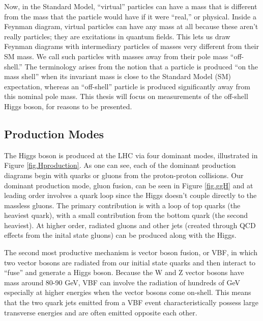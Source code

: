 Now, in the Standard Model, ``virtual'' particles can have a mass that is different from the mass that the
particle would have if it were ``real,'' or physical. Inside a Feynman diagram, virtual particles can have any
mass at all because these aren’t really particles; they are excitations in quantum fields.
This lets us draw Feynman diagrams with intermediary particles of masses very different from their SM mass. 
We call such particles with masses away from their pole mass ``off-shell.''  The terminology arises from the notion that a particle is produced ``on the mass shell'' when its invariant mass is close to the Standard Model (SM) expectation, whereas an ``off-shell'' particle is produced significantly away from this nominal pole mass. This thesis will focus on measurements of the off-shell Higgs boson, for reasons to be presented. 

\subsection{Production Modes}

The Higgs boson is produced at the LHC via four dominant modes, illustrated in Figure \ref{fig.Hproduction}. As one can see, each of the dominant production diagrams begin with quarks or gluons from the proton-proton collisions. Our dominant production mode, gluon fusion, can be seen in Figure \ref{fig.ggH} and at leading order involves a quark loop since the Higgs doesn't couple directly to the massless gluons. The primary contribution is with a loop of top quarks (the heaviest quark), with a small contribution from the bottom quark (the second heaviest). At higher order, radiated gluons and other jets (created through QCD effects from the inital state gluons) can be produced along with the Higgs. 

The second most productive mechanism is vector boson fusion, or VBF, in which two vector bosons are radiated from our initial state quarks and then interact to ``fuse'' and generate a Higgs boson. Because the W and Z vector bosons have mass around 80-90 GeV, VBF can involve the radiation of hundreds of GeV especially at higher energies when the vector bosons come on-shell. This means that the two quark jets emitted from a VBF event characteristically possess large transverse energies and are often emitted opposite each other. 

